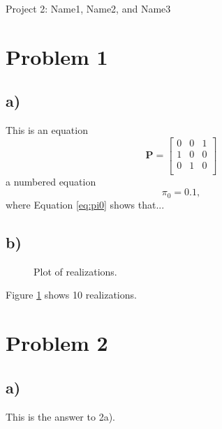 \documentclass[a4paper, 11pt]{article}
\begin{document}
{\LARGE{Project 2: Name1, Name2, and Name3}}



\section*{Problem 1}

\subsection*{a)}
This is an equation
\[
    \mathbf{P} = \begin{bmatrix} 0 & 0 & 1 \\
                                 1 & 0 & 0 \\
                                 0 & 1 & 0 \\
                 \end{bmatrix}
\]
a numbered equation
\begin{equation}
    \pi_0 = 0.1 \label{eq:pi0},
\end{equation}
where Equation \eqref{eq:pi0} shows that...

\subsection*{b)}


\begin{figure}[ht]
 \begin{center}
 \end{center}
 \caption{Plot of realizations.} \label{fig1}
 \end{figure}
Figure \ref{fig1} shows 10 realizations.



\section*{Problem 2}

\subsection*{a)}
This is the answer to 2a).
\end{document}
